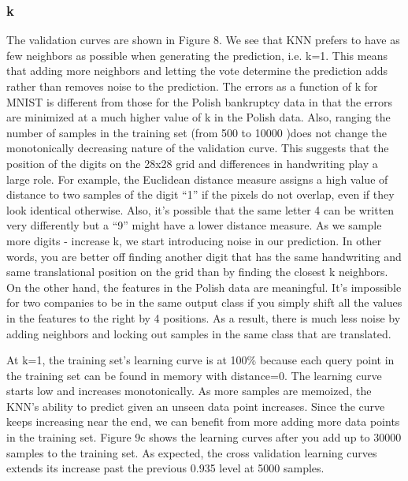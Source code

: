 \documentclass{article}
\begin{document}
\subsubsection*{k}
The validation curves are shown in Figure 8. We see that KNN prefers to have as few neighbors as possible when generating the prediction, i.e. k=1. This means that adding more neighbors and letting the vote determine the prediction adds rather than removes noise to the prediction. The errors as a function of k for MNIST is different from those for the Polish bankruptcy data in that the errors are minimized at a much higher value of k in the Polish data. Also, ranging the number of samples in the training set (from 500 to 10000 )does not change the monotonically decreasing nature of the validation curve. This suggests that the position of the digits on the 28x28 grid and differences in handwriting play a large role. For example, the Euclidean distance measure assigns a high value of distance to two samples of the digit ``1'' if the pixels do not overlap, even if they look identical otherwise. Also, it's possible that the same letter 4 can be written very differently but a ``9'' might have a lower distance measure. As we sample more digits - increase k, we start introducing noise in our prediction. In other words, you are better off finding another digit that has the same handwriting and same translational position on the grid than by finding the closest k neighbors. On the other hand, the features in the Polish data are meaningful. It's impossible for two companies to be in the same output class if you simply shift all the values in the features to the right by 4 positions. As a result, there is much less noise by adding neighbors and locking out samples in the same class that are translated. 




At k=1, the training set's learning curve is at 100\% because each query point in the training set can be found in memory with distance=0. The learning curve starts low and increases monotonically. As more samples are memoized, the KNN's ability to predict given an unseen data point increases. Since the curve keeps increasing near the end, we can benefit from more adding more data points in the training set. Figure 9c shows the learning curves after you add up to 30000 samples to the training set. As expected, the cross validation learning curves extends its increase past the previous 0.935 level at 5000 samples.
\end{document}
